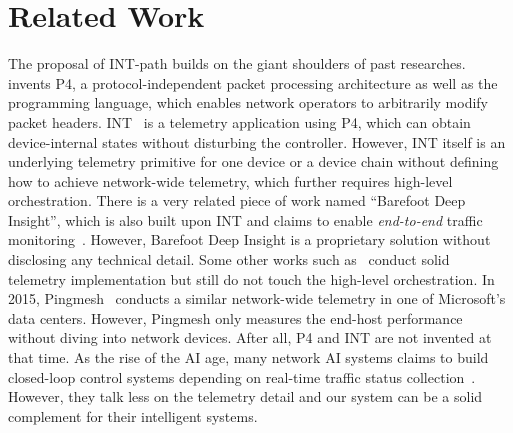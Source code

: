 \vspace{-0.1cm}
\section{Related Work}
\vspace{-0.1cm}



The proposal of INT-path builds on the giant shoulders of past researches. \cite{bosshart2014p4} invents P4, a protocol-independent packet processing architecture as well as the programming language, which enables network operators to arbitrarily modify packet headers. INT~\cite{kim2015band} is a telemetry application using P4, which can obtain device-internal states without disturbing the controller. However, INT itself is an underlying telemetry primitive for one device or a device chain without defining how to achieve network-wide telemetry, which further requires high-level orchestration. There is a very related piece of work named ``Barefoot Deep Insight'', which is also built upon INT and claims to enable \emph{end-to-end} traffic monitoring~\cite{deepinsight}. However, Barefoot Deep Insight is a proprietary solution without disclosing any technical detail. Some other works such as~\cite{van2017towards} conduct solid telemetry implementation but still do not touch the high-level orchestration. In 2015, Pingmesh~\cite{guo2015pingmesh} conducts a similar network-wide telemetry in one of Microsoft's data centers. However, Pingmesh only measures the end-host performance without diving into network devices. After all, P4 and INT are not invented at that time. As the rise of the AI age, many network AI systems claims to build closed-loop control systems depending on real-time traffic status collection~\cite{ mestres2017knowledge}. However, they talk less on the telemetry detail and our system can be a solid complement for their intelligent systems.